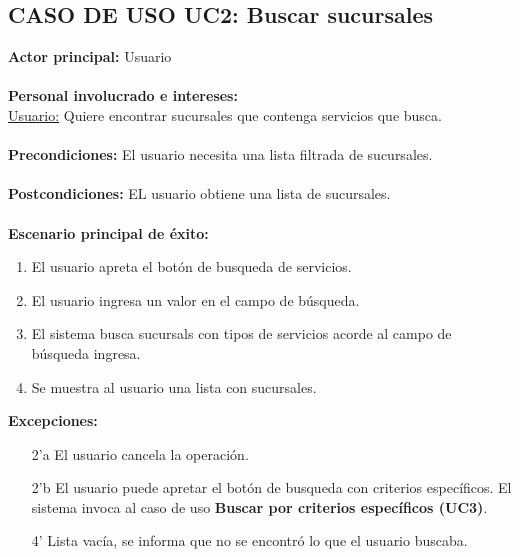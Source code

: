 \documentclass[12pt]{article}
\begin{document}
\subsection{\textbf{CASO DE USO UC2:} Buscar sucursales }
\textbf{Actor principal:} Usuario\\
\\
\textbf{Personal involucrado e intereses: }\\\underline{Usuario:} Quiere encontrar sucursales que contenga servicios que busca.\\
\\
\textbf{Precondiciones:} El usuario necesita una lista filtrada de sucursales.\\
\\
\textbf{Postcondiciones:} EL usuario obtiene una lista de sucursales.\\
\\
\textbf{Escenario principal de éxito:}
\begin{enumerate}
\item El usuario apreta el botón de busqueda de servicios.
\item El usuario ingresa un valor en el campo de búsqueda.
\item El sistema busca sucursals con tipos de servicios acorde al campo de búsqueda ingresa.
\item Se muestra al usuario una lista con sucursales.
\end{enumerate}
\textbf{Excepciones:}
\begin{enumerate}
\item[2'a] El usuario cancela la operación.
\item[2'b] El usuario puede apretar el botón de busqueda con criterios específicos. El sistema invoca al caso de uso \textbf{Buscar por criterios específicos (UC3)}.
\item[4'] Lista vacía, se informa que no se encontró lo que el usuario buscaba.
\end{enumerate}
\newpage
\end{document}
